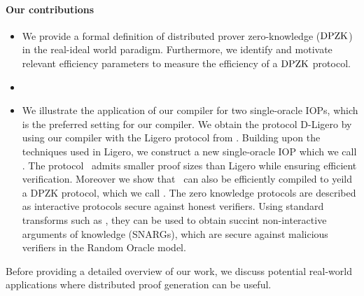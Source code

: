 \paragraph*{Our contributions}
\begin{itemize}
	\item We provide a formal definition of distributed prover zero-knowledge ($\text{DPZK}$) in the real-ideal world paradigm. Furthermore, we identify and motivate relevant efficiency parameters to measure the efficiency of a $\text{DPZK}$ protocol. 
	\item {}
	\item We illustrate the application of our compiler for two single-oracle IOPs, which is the preferred setting for our compiler.
	We obtain the protocol \textsf{D-Ligero} by using our compiler with the Ligero protocol from \cite{ligero}. Building upon the techniques
	used in Ligero, we construct a new single-oracle IOP which we call \name. The protocol \name\ admits smaller proof sizes
	than Ligero while ensuring efficient verification. Moreover we show that \name\ can also be efficiently compiled to yeild a DPZK protocol, 
	which we call \dpname. The zero knowledge protocols are described as interactive protocols secure against honest verifiers. Using standard
	transforms such as \cite{FS86, BCS16}, they can be used to obtain succint non-interactive arguments of knowledge (SNARGs), 
	which are secure against malicious verifiers in the Random Oracle model.
\end{itemize}
Before providing a detailed overview of our work, we discuss potential real-world applications where distributed proof generation can be useful. 


